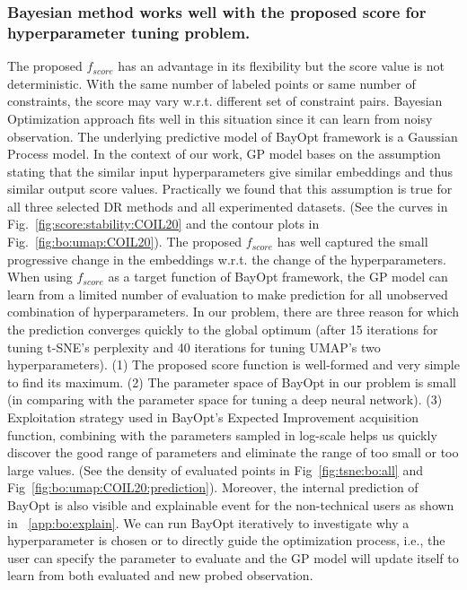 \subsubsection*{Bayesian method works well with the proposed score for hyperparameter tuning problem.}
The proposed $f_{score}$ has an advantage in its flexibility but the score value is not deterministic.
With the same number of labeled points or same number of constraints, the score may vary w.r.t. different set of constraint pairs.
Bayesian Optimization approach fits well in this situation since it can learn from noisy observation.
The underlying predictive model of BayOpt framework is a Gaussian Process model.
In the context of our work, GP model bases on the assumption stating that the similar input hyperparameters give similar embeddings and thus similar output score values.
Practically we found that this assumption is true for all three selected DR methods and all experimented datasets. (See the curves in Fig.~\ref{fig:score:stability:COIL20} and the contour plots in Fig.~\ref{fig:bo:umap:COIL20}).
The proposed $f_{score}$ has well captured the small progressive change in the embeddings w.r.t. the change of the hyperparameters.
When using $f_{score}$ as a target function of BayOpt framework, the GP model can learn from a limited number of evaluation to make prediction for all unobserved combination of hyperparameters.
In our problem, there are three reason for which the prediction converges quickly to the global optimum (after 15 iterations for tuning t-SNE's perplexity and 40 iterations for tuning UMAP's two hyperparameters).
(1) The proposed score function is well-formed and very simple to find its maximum.
(2) The parameter space of BayOpt in our problem is small (in comparing with the parameter space for tuning a deep neural network).
(3) Exploitation strategy used in BayOpt's Expected Improvement acquisition function, combining with the parameters sampled in log-scale helps us quickly discover the good range of parameters and eliminate the range of too small or too large values. (See the density of evaluated points in Fig~\ref{fig:tsne:bo:all} and Fig~\ref{fig:bo:umap:COIL20:prediction}).
Moreover, the internal prediction of BayOpt is also visible and explainable event for the non-technical users as shown in ~\ref{app:bo:explain}.
We can run BayOpt iteratively to investigate why a hyperparameter is chosen or to directly guide the optimization process, i.e., the user can specify the parameter to evaluate and the GP model will update itself to learn from both evaluated and new probed observation.

